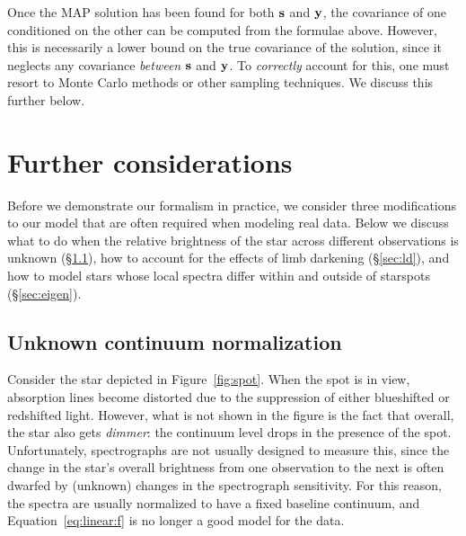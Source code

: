 \documentclass[modern]{aastex631}
\begin{document}
Once the MAP solution has been found for both ${\mathbf{s}}$ and ${\mathbf{y}}$, the covariance of one conditioned on the other can be computed from the formulae above. 
However, this is necessarily a lower bound on the true covariance of the solution, since it neglects any covariance \emph{between} ${\mathbf{s}}$ and ${\mathbf{y}}$. 
To \emph{correctly} account for this, one must resort to Monte Carlo methods or other sampling techniques. 
We discuss this further below.

\section{Further considerations}
\label{sec:bellswhistles}
%
Before we demonstrate our formalism in practice, we consider three modifications to our model that are often required when modeling real data. 
Below we discuss what to do when the relative brightness of the star across different observations is unknown (\S\ref{sec:norm}), how to account for the effects of limb darkening (\S\ref{sec:ld}), and how to model stars whose local spectra differ within and outside of starspots (\S\ref{sec:eigen}).

\subsection{Unknown continuum normalization}
\label{sec:norm}
%
Consider the star depicted in Figure~\ref{fig:spot}. 
When the spot is in view, absorption lines become distorted due to the suppression of either blueshifted or redshifted light. 
However, what is not shown in the figure is the fact that overall, the star also gets \emph{dimmer}: the continuum level drops in the presence of the spot. 
Unfortunately, spectrographs are not usually designed to measure this, since the change in the star's overall brightness from one observation to the next is often dwarfed by (unknown) changes in the spectrograph sensitivity.
For this reason, the spectra are usually normalized to have a fixed baseline continuum, and Equation~\ref{eq:linear:f} is no longer a good model for the data.
\end{document}
